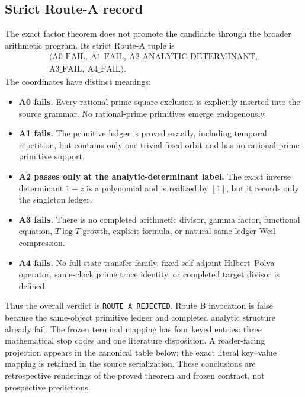 \subsection{Strict Route-A record}

The exact factor theorem does not promote the candidate through the broader
arithmetic program.  Its strict Route-A tuple is
\[
\begin{gathered}
  (\mathrm{A0\_FAIL},\ \mathrm{A1\_FAIL},\
   \mathrm{A2\_ANALYTIC\_DETERMINANT},\\
   \mathrm{A3\_FAIL},\ \mathrm{A4\_FAIL}).
\end{gathered}
\]
The coordinates have distinct meanings:

\begin{itemize}
\item \textbf{A0 fails.} Every rational-prime-square exclusion is explicitly inserted
  into the source grammar.  No rational-prime primitives emerge endogenously.
\item \textbf{A1 fails.} The primitive ledger is proved exactly, including temporal
  repetition, but contains only one trivial fixed orbit and has no
  rational-prime primitive support.
\item \textbf{A2 passes only at the analytic-determinant label.} The exact inverse
  determinant \(1-z\) is a polynomial and is realized by \([1]\), but it
  records only the singleton ledger.
\item \textbf{A3 fails.} There is no completed arithmetic divisor, gamma factor,
  functional equation, \(T\log T\) growth, explicit formula, or natural
  same-ledger Weil compression.
\item \textbf{A4 fails.} No full-state transfer family, fixed self-adjoint
  Hilbert--Polya operator, same-clock prime trace identity, or completed target
  divisor is defined.
\end{itemize}

Thus the overall verdict is \texttt{ROUTE\_A\_REJECTED}.  Route B invocation
is false because the same-object primitive ledger and completed analytic
structure already fail.  The frozen terminal mapping has four keyed entries:
three mathematical stop codes and one literature disposition.  A
reader-facing projection appears in the canonical table below; the exact
literal key--value mapping is retained in the source serialization.  These
conclusions are
retrospective renderings of the proved theorem and frozen contract, not
prospective predictions.

